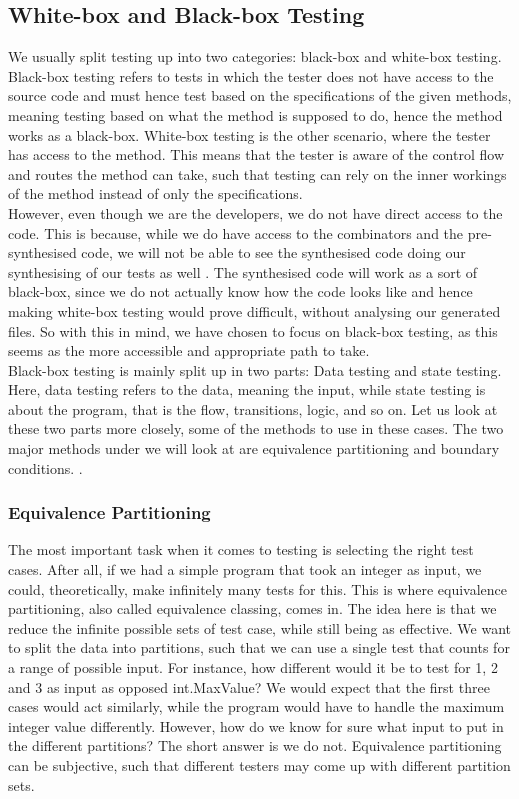 \subsection{White-box and Black-box Testing}
We usually split testing up into two categories: black-box and white-box testing. Black-box testing refers to tests in which the tester does not have access to the source code and must hence test based on the specifications of the given methods, meaning testing based on what the method is supposed to do, hence the method works as a black-box. White-box testing is the other scenario, where the tester has access to the method. This means that the tester is aware of the control flow and routes the method can take, such that testing can rely on the inner workings of the method instead of only the specifications\cite{TestingCodeComplete}. \\
However, even though we are the developers, we do not have direct access to the code. This is because, while we do have access to the combinators and the pre-synthesised code, we will not be able to see the synthesised code doing our synthesising of our tests as well . The synthesised code will work as a sort of black-box, since we do not actually know how the code looks like and hence making white-box testing would prove difficult, without analysing our generated files. So with this in mind, we have chosen to focus on black-box testing, as this seems as the more accessible and appropriate path to take. \\
Black-box testing is mainly split up in two parts: Data testing and state testing. Here, data testing refers to the data, meaning the input, while state testing is about the program, that is the flow, transitions, logic, and so on\cite{TestingBlackbox}. Let us look at these two parts more closely, some of the methods to use in these cases. The two major methods under we will look at are equivalence partitioning and boundary conditions. .
\subsubsection{Equivalence Partitioning}
The most important task when it comes to testing is selecting the right test cases\cite{TestingBlackbox}. After all, if we had a simple program that took an integer as input, we could, theoretically, make infinitely many tests for this. This is where equivalence partitioning, also called equivalence classing, comes in. The idea here is that we reduce the infinite possible sets of test case, while still being as effective. We want to split the data into partitions, such that we can use a single test that counts for a range of possible input. For instance, how different would it be to test for 1, 2 and 3 as input as opposed int.MaxValue? We would expect that the first three cases would act similarly, while the program would have to handle the maximum integer value differently. However, how do we know for sure what input to put in the different partitions? The short answer is we do not. Equivalence partitioning can be subjective, such that different testers may come up with different partition sets\cite{TestingBlackbox}. 
